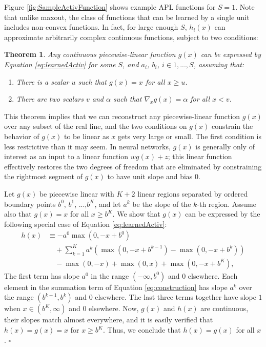 \documentclass{article} \usepackage{iclr2015,times}
\newtheorem{theorem}{Theorem}
\newenvironment{proof}[1][Proof]{\begin{trivlist}
\item[\hskip \labelsep {\bfseries #1}]}{\end{trivlist}}
\begin{document}
Figure \ref{fig:SampleActivFunction} shows example
APL functions for $S=1$.  Note that unlike maxout, the class of functions that can be learned by a single unit includes non-convex functions.  In fact, for large
enough $S$, $h_i(x)$ can approximate arbitrarily complex continuous functions, subject to two conditions:



\begin{theorem}
\label{thm:universality}
Any continuous piecewise-linear function $g(x)$ can be expressed by
Equation \ref{eq:learnedActiv} for some $S$, and $a_i$, $b_i$, $i\in{1,...,S}$, assuming that:
\begin{enumerate}
\item There is a scalar $u$ such that $g(x) = x$ for all $x\ge u$.
\item There are two scalars $v$ and $\alpha$ such that $\nabla_x g(x) = \alpha$
for all $x < v$.
\end{enumerate}
\end{theorem}
This theorem implies that we can reconstruct any piecewise-linear
function $g(x)$ over any subset of the real line, and the two
conditions on $g(x)$ constrain the behavior of $g(x)$ to be linear as
$x$ gets very large or small. The first condition is less restrictive
than it may seem. In neural networks, $g(x)$ is generally only of
interest as an input to a linear function $wg(x) + z$; this linear
function effectively restores the two degrees of freedom that are
eliminated by constraining the rightmost segment of $g(x)$ to have
unit slope and bias 0.

\begin{proof}
Let $g(x)$ be piecewise linear with $K+2$ linear regions separated by ordered boundary points $b^0$, $b^1$, ...,$b^K$, and let $a^k$ be the slope of the $k$-th region. Assume also that $g(x)=x$ for all $x \ge b^K$.   We show that $g(x)$ can be expressed by the following special case of Equation \ref{eq:learnedActiv}:
\begin{equation}
\begin{split}
\label{eq:construction}
h(x) &\equiv - a^0 \max(0, -x + b^0) \\
& \quad \textstyle + \sum_{k=1}^{K} a^{k}(\max(0,-x+b^{k-1}) - \max(0, -x+b^{k})) \\
& \quad \textstyle - \max(0,-x) + \max(0,x)  + \max(0, -x+b^{K}), 
\end{split}
\end{equation}
The first term has slope $a^0$ in the range $(-\infty, b^0)$ and $0$ elsewhere. Each element in the summation term of Equation \ref{eq:construction} has slope $a^k$ over the range $(b^{k-1}, b^k)$ and $0$ elsewhere. The last three terms together have slope $1$ when $x\in(b^K, \infty)$ and $0$ elsewhere. Now, $g(x)$ and $h(x)$ are continuous, their slopes match almost everywhere, and it is easily verified that $h(x)=g(x)=x$ for $x \ge b^K$. Thus, we conclude that $h(x)=g(x)$ for all $x$. $\square$
\end{proof}
\end{document}
